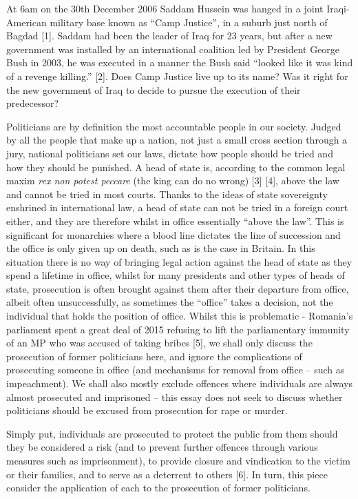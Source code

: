 At 6am on the 30th December 2006 Saddam Hussein was hanged in a joint Iraqi-American military base known as “Camp Justice”, in a suburb just north of Bagdad [1]. Saddam had been the leader of Iraq for 23 years, but after a new government was installed by an international coalition led by President George Bush in 2003, he was executed in a manner the Bush said “looked like it was kind of a revenge killing.” [2]. Does Camp Justice live up to its name? Was it right for the new government of Iraq to decide to pursue the execution of their predecessor?

Politicians are by definition the most accountable people in our society. Judged by all the people that make up a nation, not just a small cross section through a jury, national politicians set our laws, dictate how people should be tried and how they should be punished. A head of state is, according to the common legal maxim \textit{rex non potest peccare} (the king can do no wrong) [3] [4], above the law and cannot be tried in most courts. Thanks to the ideas of state sovereignty enshrined in international law, a head of state can not be tried in a foreign court either, and they are therefore whilst in office essentially “above the law”. This is significant for monarchies where a blood line dictates the line of succession and the office is only given up on death, such as is the case in Britain. In this situation there is no way of bringing legal action against the head of state as they spend a lifetime in office, whilst for many presidents and other types of heads of state, prosecution is often brought against them after their departure from office, albeit often unsuccessfully, as sometimes the “office” takes a decision, not the individual that holds the position of office. Whilst this is problematic - Romania’s parliament spent a great deal of 2015 refusing to lift the parliamentary immunity of an MP who was accused of taking bribes [5], we shall only discuss the prosecution of former politicians here, and ignore the complications of prosecuting someone in office (and mechanisms for removal from office – such as impeachment). We shall also mostly exclude offences where individuals are always almost prosecuted and imprisoned – this essay does not seek to discuss whether politicians should be excused from prosecution for rape or murder.

Simply put, individuals are prosecuted to protect the public from them should they be considered a risk (and to prevent further offences through various measures such as imprisonment), to provide closure and vindication to the victim or their families, and to serve as a deterrent to others [6]. In turn, this piece consider the application of each to the prosecution of former politicians.

